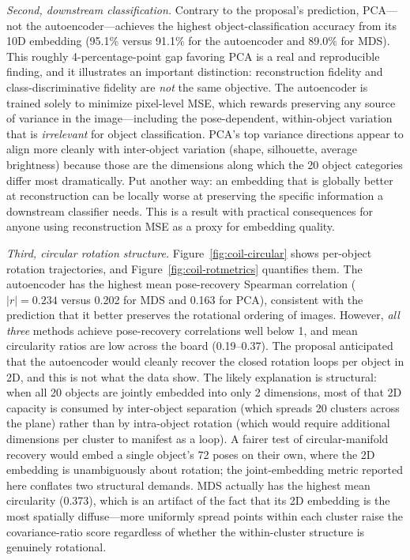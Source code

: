 \documentclass[11pt]{article}
\begin{document}
\emph{Second, downstream classification.} Contrary to the proposal's prediction, PCA---not the autoencoder---achieves the highest object-classification accuracy from its 10D embedding (95.1\% versus 91.1\% for the autoencoder and 89.0\% for MDS). This roughly 4-percentage-point gap favoring PCA is a real and reproducible finding, and it illustrates an important distinction: reconstruction fidelity and class-discriminative fidelity are \emph{not} the same objective. The autoencoder is trained solely to minimize pixel-level MSE, which rewards preserving any source of variance in the image---including the pose-dependent, within-object variation that is \emph{irrelevant} for object classification. PCA's top variance directions appear to align more cleanly with inter-object variation (shape, silhouette, average brightness) because those are the dimensions along which the 20 object categories differ most dramatically. Put another way: an embedding that is globally better at reconstruction can be locally worse at preserving the specific information a downstream classifier needs. This is a result with practical consequences for anyone using reconstruction MSE as a proxy for embedding quality.

\emph{Third, circular rotation structure.} Figure~\ref{fig:coil-circular} shows per-object rotation trajectories, and Figure~\ref{fig:coil-rotmetrics} quantifies them. The autoencoder has the highest mean pose-recovery Spearman correlation ($|r| = 0.234$ versus 0.202 for MDS and 0.163 for PCA), consistent with the prediction that it better preserves the rotational ordering of images. However, \emph{all three} methods achieve pose-recovery correlations well below 1, and mean circularity ratios are low across the board (0.19--0.37). The proposal anticipated that the autoencoder would cleanly recover the closed rotation loops per object in 2D, and this is not what the data show. The likely explanation is structural: when all 20 objects are jointly embedded into only 2 dimensions, most of that 2D capacity is consumed by inter-object separation (which spreads 20 clusters across the plane) rather than by intra-object rotation (which would require additional dimensions per cluster to manifest as a loop). A fairer test of circular-manifold recovery would embed a single object's 72 poses on their own, where the 2D embedding is unambiguously about rotation; the joint-embedding metric reported here conflates two structural demands. MDS actually has the highest mean circularity (0.373), which is an artifact of the fact that its 2D embedding is the most spatially diffuse---more uniformly spread points within each cluster raise the covariance-ratio score regardless of whether the within-cluster structure is genuinely rotational.
\end{document}
